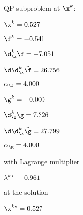 QP subproblem at $\x^{k}$:

\bigskip
$\x^k=   0.527$


$\f^k =  -0.541$

$\d^k_{\x} \f =  -7.051$

$\d\d^k_{\x} \tilde \f =  26.756$

$\alpha_{\footnotesize\f} =   4.000$

\bigskip
$\g^k =  -0.000$

$\d^k_{\x}\g =   7.326$

$\d\d^k_{\x} \tilde \g =  27.799$

$\alpha_{\footnotesize\g} =   4.000$

\bigskip
with Lagrange multiplier

$\lambda^{k\star} =   0.961$

at the solution

$\x^{k\star} =   0.527$

